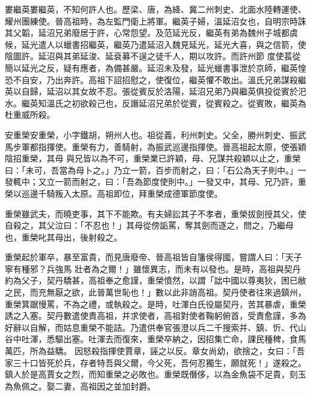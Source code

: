 \begin{pinyinscope}
 婁繼英婁繼英，不知何許人也。歷梁、唐，為絳、冀二州刺史、北面水陸轉運使、耀州團練使。晉高祖時，為左監門衛上將軍。繼英子婦，溫延沼女也，自明宗時誅其父韜，延沼兄弟廢居于許，心常怨望。及范延光反，繼英有弟為魏州子城都虞候，延光遣人以蠟書招繼英，繼英乃遣延沼入魏見延光，延光大喜，與之信箭，使陰圖許。延沼與其弟延浚、延袞募不逞之徒千人，期以攻許。而許州節
 度使萇從簡以延光之反，疑有應者，為備甚嚴。延沼未及發，延光蠟書事泄於京師，繼英惶恐不自安，乃出奔許。高祖下詔招慰之，使復位，繼英懼不敢出。溫氏兄弟謀殺繼英以自歸，延沼以其女故不忍。張從賓反於洛陽，延沼兄弟乃與繼英俱投從賓於汜水。繼英知溫氏之初欲殺己也，反譖延沼兄弟於從賓，從賓殺之。從賓敗，繼英為杜重威所殺。



 安重榮安重榮，小字鐵胡，朔州人也。祖從義，利州刺史。父全，勝州刺史、振武馬步軍都指揮使。重榮有力，善騎射，為振武巡邊指揮使。晉高祖起太原，使張穎陰招重榮，其母
 與兄皆以為不可，重榮業已許穎，母、兄謀共殺穎以止之，重榮曰：「未可，吾當為母卜之。」乃立一箭，百步而射之，曰：「石公為天子則中。」一發輒中；又立一箭而射之，曰：「吾為節度使則中。」一發又中，其母、兄乃許，重榮以巡邊千騎叛入太原。高祖即位，拜重榮成德軍節度使。



 重榮雖武夫，而曉吏事，其下不能欺。有夫婦訟其子不孝者，重榮拔劍授其父，使自殺之，其父泣曰：「不忍也！」其母從傍詬罵，奪其劍而逐之，問之，乃繼母也，重榮叱其母出，後射殺之。



 重榮起於軍卒，暴至富貴，而見唐廢帝、晉高祖皆自籓侯得國，嘗謂人曰：「天子寧有種邪？兵強馬
 壯者為之爾！」雖懷異志，而未有以發也。是時，高祖與契丹約為父子，契丹驕甚，高祖奉之愈謹，重榮憤然，以謂「詘中國以尊夷狄，困已敝之民，而充無厭之欲，此晉萬世恥也！」數以此非誚高祖。契丹使者往來過鎮州，重榮箕踞慢罵，不為之禮，或執殺之。是時，吐渾白氏役屬契丹，苦其暴虐，重榮誘之入塞。契丹數遣使責高祖，并求使者，高祖對使者鞠躬俯首，受責愈謹，多為好辭以自解，而姑息重榮不能詰。乃遣供奉官張澄以兵二千搜索并、鎮、忻、代山谷中吐渾，悉驅出塞。吐渾去而復來，重榮卒納之，因招集亡命，課民種稗，食馬萬匹，所為益驕。
 因怒殺指揮使賈章，誣之以反。章女尚幼，欲捨之，女曰：「吾家三十口皆死於兵，存者特吾與父爾，今父死，吾何忍獨生，願就死！」遂殺之。鎮人於是高賈女之烈，而知重榮之必敗也。重榮既僭侈，以為金魚袋不足貴，刻玉為魚佩之。娶二妻，高祖因之並加封爵。




\end{pinyinscope}
